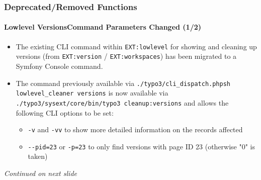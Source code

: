 \begin{frame}[fragile]
	\frametitle{Deprecated/Removed Functions}
	\framesubtitle{Lowlevel VersionsCommand Parameters Changed (1/2)}

	\begin{itemize}
		\item The existing CLI command within \texttt{EXT:lowlevel} for showing and cleaning up versions (from
			\texttt{EXT:version} / \texttt{EXT:workspaces}) has been migrated to a Symfony Console command.

		\item The command previously available via \texttt{./typo3/cli\_dispatch.phpsh lowlevel\_cleaner versions}
			is now available via \texttt{./typo3/sysext/core/bin/typo3 cleanup:versions} and allows the following
			CLI options to be set:

			\begin{itemize}
				\item \texttt{-v} and \texttt{-vv} to show more detailed information on the records affected
				\item \texttt{-}\texttt{-pid=23} or \texttt{-p=23} to only find versions with page ID 23 (otherwise "0" is taken)
			\end{itemize}

	\end{itemize}

	\small\textit{Continued on next slide}\normalsize

\end{frame}


